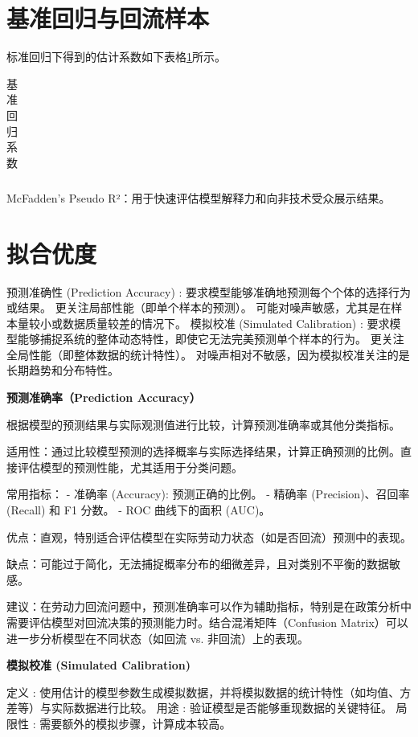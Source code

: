 \documentclass[a4paper,12pt,oneside, fontset=mac]{ctexbook} %
\begin{document}
\section{基准回归与回流样本} %


标准回归下得到的估计系数如下表格\ref{tab:基准回归系数}所示。
\begin{table}[!ht]
\centering
\caption{基准回归系数}
\begin{tabularx}{\textwidth}{@{}cXXX@{}}
\toprule
\midrule
\bottomrule
\end{tabularx}
\label{tab:基准回归系数}
\end{table}



McFadden’s Pseudo R²：用于快速评估模型解释力和向非技术受众展示结果。


\section{拟合优度} 

预测准确性 (Prediction Accuracy) :
要求模型能够准确地预测每个个体的选择行为或结果。
更关注局部性能（即单个样本的预测）。
可能对噪声敏感，尤其是在样本量较小或数据质量较差的情况下。
模拟校准 (Simulated Calibration) :
要求模型能够捕捉系统的整体动态特性，即使它无法完美预测单个样本的行为。
更关注全局性能（即整体数据的统计特性）。
对噪声相对不敏感，因为模拟校准关注的是长期趋势和分布特性。

\textbf{预测准确率（Prediction Accuracy）}

根据模型的预测结果与实际观测值进行比较，计算预测准确率或其他分类指标。

适用性：通过比较模型预测的选择概率与实际选择结果，计算正确预测的比例。直接评估模型的预测性能，尤其适用于分类问题。

常用指标：
- 准确率 (Accuracy): 预测正确的比例。
- 精确率 (Precision)、召回率 (Recall) 和 F1 分数。
- ROC 曲线下的面积 (AUC)。

优点：直观，特别适合评估模型在实际劳动力状态（如是否回流）预测中的表现。

缺点：可能过于简化，无法捕捉概率分布的细微差异，且对类别不平衡的数据敏感。

建议：在劳动力回流问题中，预测准确率可以作为辅助指标，特别是在政策分析中需要评估模型对回流决策的预测能力时。结合混淆矩阵（Confusion Matrix）可以进一步分析模型在不同状态（如回流 vs. 非回流）上的表现。


\textbf{模拟校准 (Simulated Calibration)}

定义 : 使用估计的模型参数生成模拟数据，并将模拟数据的统计特性（如均值、方差等）与实际数据进行比较。
用途 : 验证模型是否能够重现数据的关键特征。
局限性 : 需要额外的模拟步骤，计算成本较高。
\end{document}
